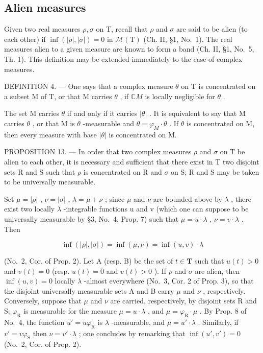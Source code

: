 \subsection{Alien measures}

Given two real measures \(\rho,\sigma\) on T, recall that \(\rho\) and \(\sigma\) are said to be alien (to each other) if \(\inf(|\rho|,|\sigma|)=0\) in \(\mathcal{M}(\mathrm{T})\) (Ch. II, §1, No.~1). The real measures alien to a given measure are known to form a band (Ch. II, §1, No.~5, Th. 1). This definition may be extended immediately to the case of complex measures.

DEFINITION 4. --- One says that a complex measure \(\theta\) on T is concentrated on a subset M of T, or that M carries \(\theta\) , if \(\mathbb{C}M\) is locally negligible for \(\theta\) .

The set M carries \(\theta\) if and only if it carries \(|\theta|\) . It is equivalent to say that M carries \(\theta\) , or that M is \(\theta\) -measurable and \(\theta = \varphi_{M} \cdot \theta\) . If \(\theta\) is concentrated on M, then every measure with base \(|\theta|\) is concentrated on M.

PROPOSITION 13. --- In order that two complex measures \(\rho\) and \(\sigma\) on T be alien to each other, it is necessary and sufficient that there exist in T two disjoint sets R and S such that \(\rho\) is concentrated on R and \(\sigma\) on S; R and S may be taken to be universally measurable.

Set \(\mu = |\rho|\) , \(\nu = |\sigma|\) , \(\lambda = \mu + \nu\) ; since \(\mu\) and \(\nu\) are bounded above by \(\lambda\) , there exist two locally \(\lambda\) -integrable functions u and v (which one can suppose to be universally measurable by §3, No.~4, Prop. 7) such that \(\mu = u \cdot \lambda\) , \(\nu = v \cdot \lambda\) . Then

\[
\inf (| \rho |, | \sigma |) = \inf (\mu , \nu) = \inf (u, v) \cdot \lambda
\]

(No.~2, Cor. of Prop. 2). Let A (resp. B) be the set of \(t \in \mathbf{T}\) such that \(u(t) > 0\) and \(v(t) = 0\) (resp. \(u(t) = 0\) and \(v(t) > 0\) ). If \(\rho\) and \(\sigma\) are alien, then \(\inf(u, v) = 0\) locally \(\lambda\) -almost everywhere (No.~3, Cor. 2 of Prop. 3), so that the disjoint universally measurable sets A and B carry \(\mu\) and \(\nu\) , respectively. Conversely, suppose that \(\mu\) and \(\nu\) are carried, respectively, by disjoint sets R and S; \(\varphi_{\mathrm{R}}\) is measurable for the measure \(\mu = u \cdot \lambda\) , and \(\mu = \varphi_{\mathrm{R}} \cdot \mu\) . By Prop. 8 of No.~4, the function \(u' = u\varphi_{\mathrm{R}}\) is \(\lambda\) -measurable, and \(\mu = u' \cdot \lambda\) . Similarly, if \(v' = v\varphi_{\mathrm{S}}\) then \(\nu = v' \cdot \lambda\) ; one concludes by remarking that \(\inf(u', v') = 0\) (No.~2, Cor. of Prop. 2).

